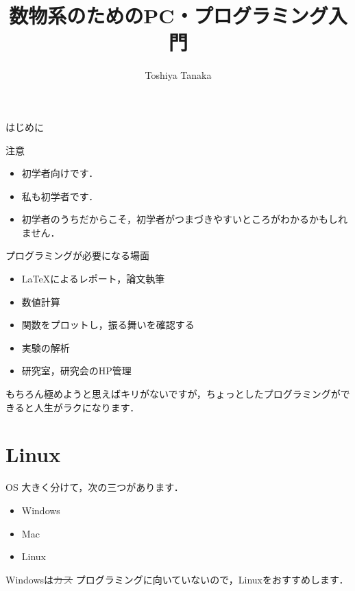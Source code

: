\documentclass[dvipdfmx]{beamer}
\author[T. Tanaka]{Toshiya Tanaka}
\institute[Univ. Toyama]{University of Toyama}
\title[\textcolor{white}{プログラミング入門}]{数物系のためのPC・プログラミング入門}
\theoremstyle{break}
\begin{document}
\begin{frame}
		\maketitle
\end{frame}


\begin{frame}{はじめに}
		\begin{alertblock}{注意}
				\begin{itemize}
						\item 初学者向けです．
						\item 私も初学者です．
						\item 初学者のうちだからこそ，初学者がつまづきやすいところがわかるかもしれません．
				\end{itemize}
		\end{alertblock}
		\begin{block}{プログラミングが必要になる場面}
				\begin{itemize}
						\item \LaTeX によるレポート，論文執筆
						\item 数値計算
						\item 関数をプロットし，振る舞いを確認する
						\item 実験の解析
						\item 研究室，研究会のHP管理
				\end{itemize}
		\end{block}
		もちろん極めようと思えばキリがないですが，ちょっとしたプログラミングができると人生がラクになります．
\end{frame}

\section{Linux}
\begin{frame}{OS}
		大きく分けて，次の三つがあります．
		\begin{itemize}
				\item Windows
				\item Mac
				\item Linux
		\end{itemize}
		Windowsは{\sout{\textcolor{gray}{カス}}}
		プログラミングに向いていないので，Linuxをおすすめします．
\end{frame}
\end{document}
